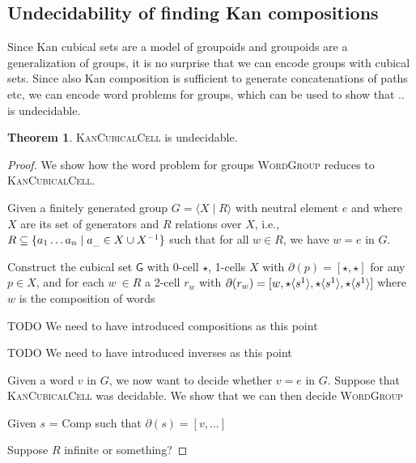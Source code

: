 \documentclass[11pt]{article}
\theoremstyle{definition}
\newtheorem{theorem}{Theorem}
\newcommand{\todo}[1]{
  \begin{tcolorbox}
    TODO {#1} 
  \end{tcolorbox}
}
\newcommand{\problem}[1]{\textsc{{#1}}}
\newcommand{\mlist}[1]{[ {#1} ]}
\newcommand{\smap}[1]{s^{{#1}}}
\newcommand{\dmap}[2]{d^{({#1} , {#2})}}
\newcommand{\cont}[2]{\ensuremath{ \ifthenelse{\equal{#2}{}}{#1}{{#1}\langle{#2}\rangle}} }
\newcommand{\cset}[1]{\ensuremath{\mathsf{{#1}}}}
\newcommand{\boundary}[1]{\partial({#1})}
\begin{document}
\subsection{Undecidability of finding Kan compositions}
\label{ssec:kanundecidable}

Since Kan cubical sets are a model of groupoids and groupoids are a generalization
of groups, it is no surprise that we can encode groups with cubical sets.
Since also Kan composition is sufficient to generate concatenations of paths
etc, we can encode word problems for groups, which can be used to show that ..
is undecidable.
 

\begin{theorem}
  \problem{KanCubicalCell} is undecidable.
  \begin{proof} 
    We show how the word problem for groups \problem{WordGroup} reduces to
    \problem{KanCubicalCell}.

    Given a finitely generated group $G = \langle X \mid R \rangle$ with neutral
    element $e$ and where $X$ are its set of generators and $R$ relations over
    $X$, i.e., $R \subseteq \{ a_1 \mathellipsis a_n \mid a_\_ \in X \cup X^{-1}
    \}$ such that for all $w \in R$, we have $w = e$ in $G$.
    

    Construct the cubical set \cset{G} with 0-cell $\star$, 1-cells $X$ with
    $\boundary{p} = \mlist{\star , \star}$ for any $p \in X$, and for each $w \
    \in R$ a 2-cell $r_w$ with $\boundary{r_w} = \mlist{ w , \cont{\star}{\smap{1}} ,
      \cont{\star}{\smap{1}} , \cont{\star}{\smap{1}}}$ where $w$ is the
    composition of words

    \todo{We need to have introduced compositions as this point}
    \todo{We need to have introduced inverses as this point}

    Given a word $v$ in $G$, we now want to decide whether $v = e$ in $G$.
    Suppose that \problem{KanCubicalCell} was decidable. We show that we can
    then decide \problem{WordGroup}

    Given $s$ = Comp such that $\boundary{s} = \mlist{ v , ... }$
    
    
    Suppose $R$ infinite or something?



\end{proof}
\end{theorem}
\end{document}
